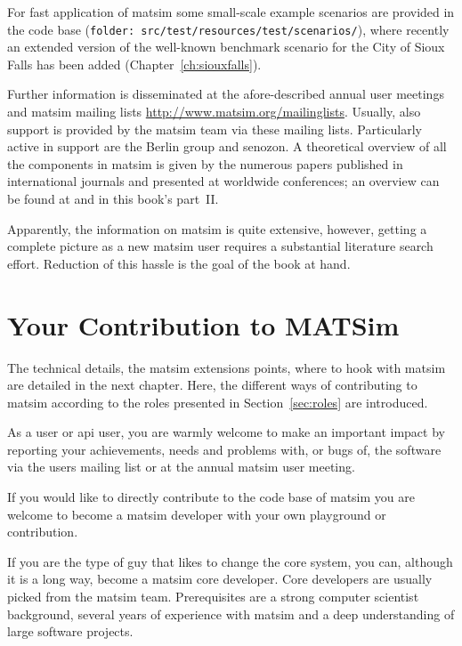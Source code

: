For fast application of \gls{matsim} some small-scale example scenarios are provided in the code base (\lstinline|folder: src/test/resources/test/scenarios/|), where recently an extended version of the well-known benchmark scenario for the City of Sioux Falls has been added \citep[][]{ChakirovFourie_TechRep_FCL_2014} (Chapter~\ref{ch:siouxfalls}).

Further information is disseminated at the afore-described annual user meetings and \gls{matsim} mailing lists \url{http://www.matsim.org/mailinglists}. Usually, also support is provided by the \gls{matsim} team via these mailing lists. Particularly active in support are the Berlin group and \gls{senozon}. A theoretical overview of all the components in \gls{matsim} is given by the numerous papers published in international journals and presented at worldwide conferences; an overview can be found at \citep[][]{MATSIM-Publications_Webpage_2015} and in this book's part~II.

Apparently, the information on \gls{matsim} is quite extensive, however, getting a complete picture as a new \gls{matsim} user requires a substantial literature search effort. Reduction of this hassle is the goal of the book at hand.

\section{Your Contribution to MATSim}
\label{sec:yourcontribution}
The technical details, \ie the \gls{matsim} extensions points, where to hook with \gls{matsim} are detailed in the next chapter. Here, the different ways of contributing to \gls{matsim} according to the roles presented in Section~\ref{sec:roles} are introduced.

As a user or \gls{api} user, you are warmly welcome to make an important impact by reporting your achievements, needs and problems with, or bugs of, the software via the users mailing list or at the annual \gls{matsim} user meeting. 

If you would like to directly contribute to the code base of \gls{matsim} you are welcome to become a \gls{matsim} developer with your own playground or \gls{contribution}.

If you are the type of guy that likes to change the core system, you can, although it is a long way, become a \gls{matsim} core developer. Core developers are usually picked from the \gls{matsim} team. Prerequisites are a strong computer scientist background, several years of experience with \gls{matsim} and a deep understanding of large software projects.

